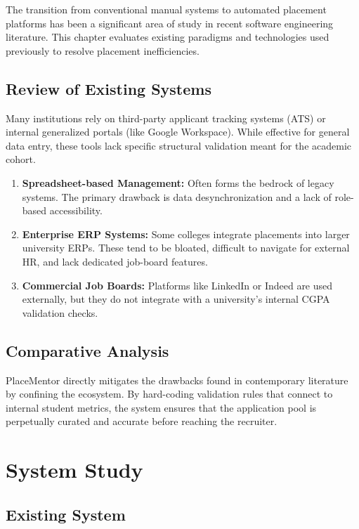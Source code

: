 \documentclass[a4paper,12pt]{report}
\begin{document}
The transition from conventional manual systems to automated placement platforms has been a significant area of study in recent software engineering literature. This chapter evaluates existing paradigms and technologies used previously to resolve placement inefficiencies.

\section{Review of Existing Systems}

Many institutions rely on third-party applicant tracking systems (ATS) or internal generalized portals (like Google Workspace). While effective for general data entry, these tools lack specific structural validation meant for the academic cohort.

\begin{enumerate}
    \item \textbf{Spreadsheet-based Management:} Often forms the bedrock of legacy systems. The primary drawback is data desynchronization and a lack of role-based accessibility.
    \item \textbf{Enterprise ERP Systems:} Some colleges integrate placements into larger university ERPs. These tend to be bloated, difficult to navigate for external HR, and lack dedicated job-board features.
    \item \textbf{Commercial Job Boards:} Platforms like LinkedIn or Indeed are used externally, but they do not integrate with a university's internal CGPA validation checks.
\end{enumerate}

\section{Comparative Analysis}

PlaceMentor directly mitigates the drawbacks found in contemporary literature by confining the ecosystem. By hard-coding validation rules that connect to internal student metrics, the system ensures that the application pool is perpetually curated and accurate before reaching the recruiter.

\chapter{System Study}

\section{Existing System}
\end{document}
